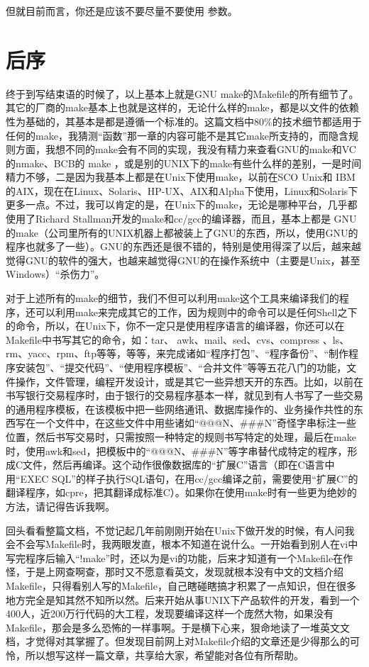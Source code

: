 \documentclass[a4paper,10pt]{sphinxmanual}
\begin{document}
但就目前而言，你还是应该不要尽量不要使用  参数。


\chapter{后序}
\label{\detokenize{postscript:id1}}\label{\detokenize{postscript::doc}}
终于到写结束语的时候了，以上基本上就是GNU make的Makefile的所有细节了。其它的厂商的make基本上也就是这样的，无论什么样的make，都是以文件的依赖性为基础的，其基本是都是遵循一个标准的。这篇文档中80\%的技术细节都适用于任何的make，我猜测“函数”那一章的内容可能不是其它make所支持的，而隐含规则方面，我想不同的make会有不同的实现，我没有精力来查看GNU的make和VC的nmake、BCB的 make
，或是别的UNIX下的make有些什么样的差别，一是时间精力不够，二是因为我基本上都是在Unix下使用make，以前在SCO Unix和 IBM的AIX，现在在Linux、Solaris、HP-UX、AIX和Alpha下使用，Linux和Solaris下更多一点。不过，我可以肯定的是，在Unix下的make，无论是哪种平台，几乎都使用了Richard Stallman开发的make和cc/gcc的编译器，而且，基本上都是 GNU的make（公司里所有的UNIX机器上都被装上了GNU的东西，所以，使用GNU的程序也就多了一些）。GNU的东西还是很不错的，特别是使用得深了以后，越来越觉得GNU的软件的强大，也越来越觉得GNU的在操作系统中（主要是Unix，甚至Windows）“杀伤力”。

对于上述所有的make的细节，我们不但可以利用make这个工具来编译我们的程序，还可以利用make来完成其它的工作，因为规则中的命令可以是任何Shell之下的命令，所以，在Unix下，你不一定只是使用程序语言的编译器，你还可以在Makefile中书写其它的命令，如：tar、 awk、mail、sed、cvs、compress
、ls、rm、yacc、rpm、ftp等等，等等，来完成诸如“程序打包”、“程序备份”、“制作程序安装包”、“提交代码”、“使用程序模板”、“合并文件”等等五花八门的功能，文件操作，文件管理，编程开发设计，或是其它一些异想天开的东西。比如，以前在书写银行交易程序时，由于银行的交易程序基本一样，就见到有人书写了一些交易的通用程序模板，在该模板中把一些网络通讯、数据库操作的、业务操作共性的东西写在一个文件中，在这些文件中用些诸如“@@@N、\#\#\#N”奇怪字串标注一些位置，然后书写交易时，只需按照一种特定的规则书写特定的处理，最后在make时，使用awk和sed，把模板中的“@@@N、\#\#\#N”等字串替代成特定的程序，形成C文件，然后再编译。这个动作很像数据库的“扩展C”语言（即在C语言中用“EXEC SQL”的样子执行SQL语句，在用cc/gcc编译之前，需要使用“扩展C”的翻译程序，如cpre，把其翻译成标准C）。如果你在使用make时有一些更为绝妙的方法，请记得告诉我啊。

回头看看整篇文档，不觉记起几年前刚刚开始在Unix下做开发的时候，有人问我会不会写Makefile时，我两眼发直，根本不知道在说什么。一开始看到别人在vi中写完程序后输入“!make”时，还以为是vi的功能，后来才知道有一个Makefile在作怪，于是上网查啊查，那时又不愿意看英文，发现就根本没有中文的文档介绍Makefile，只得看别人写的Makefile，自己瞎碰瞎搞才积累了一点知识，但在很多地方完全是知其然不知所以然。后来开始从事UNIX下产品软件的开发，看到一个400人，近200万行代码的大工程，发现要编译这样一个庞然大物，如果没有Makefile，那会是多么恐怖的一样事啊。于是横下心来，狠命地读了一堆英文文档，才觉得对其掌握了。但发现目前网上对Makefile介绍的文章还是少得那么的可怜，所以想写这样一篇文章，共享给大家，希望能对各位有所帮助。
\end{document}

